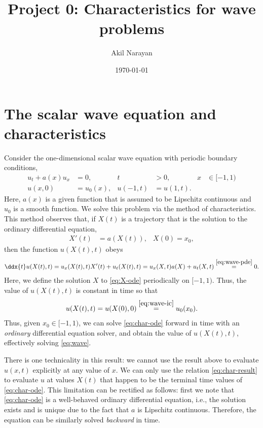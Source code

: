 \documentclass[11pt]{amsart}
\title{Project 0: Characteristics for wave problems}
\author{Akil Narayan}
\date{\today}
\begin{document}
\maketitle

\section{The scalar wave equation and characteristics}
Consider the one-dimensional scalar wave equation with periodic boundary conditions,
\begin{subequations}\label{eq:wave}
  \begin{align}\label{eq:wave-pde}
    u_t + a(x) u_x &= 0, & t &> 0, & x &\in [-1,1) \\\label{eq:wave-ic}
  u(x,0) &= u_0(x), & u(-1,t) &= u(1,t).
\end{align}
\end{subequations}
Here, $a(x)$ is a given function that is assumed to be Lipschitz continuous and $u_0$ is a smooth function. We solve this problem via the method of characteristics. This method observes that, if $X(t)$ is a trajectory that is the solution to the ordinary differential equation,
\begin{align}\label{eq:X-ode}
  X'(t) &= a(X(t)), & X(0) = x_0,
\end{align}
then the function $u(X(t), t)$ obeys
\begin{align}\label{eq:char-ode}
  \ddx{t} u(X(t),t) = u_x(X(t),t) X'(t) + u_t(X(t),t) = u_x(X,t) a(X) + u_t(X,t) \stackrel{\eqref{eq:wave-pde}}{=} 0.
\end{align}
Here, we define the solution $X$ to \eqref{eq:X-ode} periodically on $[-1,1)$. Thus, the value of $u(X(t),t)$ is constant in time so that
\begin{align}\label{eq:char-result}
  u(X(t),t) = u(X(0),0) \stackrel{\eqref{eq:wave-ic}}{=} u_0(x_0).
\end{align}
Thus, given $x_0 \in [-1,1)$, we can solve \eqref{eq:char-ode} forward in time with an \textit{ordinary} differential equation solver, and obtain the value of $u(X(t),t)$, effectively solving \eqref{eq:wave}. 

  There is one technicality in this result: we cannot use the result above to evaluate $u(x,t)$ explicitly at any value of $x$. We can only use the relation \eqref{eq:char-result} to evaluate $u$ at values $X(t)$ that happen to be the terminal time values of \eqref{eq:char-ode}. This limitation can be rectified as follows: first we note that \eqref{eq:char-ode} is a well-behaved ordinary differential equation, i.e., the solution exists and is unique due to the fact that $a$ is Lipschitz continuous. Therefore, the equation can be similarly solved \textit{backward} in time. 
\end{document}
